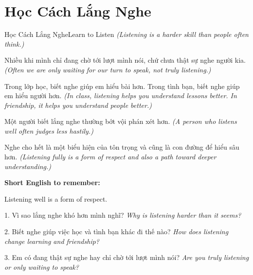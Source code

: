 \section{Học Cách Lắng Nghe}
\begin{truyen}{Học Cách Lắng Nghe}{Learn to Listen}
\textit{(Listening is a harder skill than people often think.)}

Nhiều khi mình chỉ đang chờ tới lượt mình nói, chứ chưa thật sự nghe người kia.
\textit{(Often we are only waiting for our turn to speak, not truly listening.)}

Trong lớp học, biết nghe giúp em hiểu bài hơn. Trong tình bạn, biết nghe giúp em hiểu người hơn.
\textit{(In class, listening helps you understand lessons better. In friendship, it helps you understand people better.)}

Một người biết lắng nghe thường bớt vội phán xét hơn.
\textit{(A person who listens well often judges less hastily.)}
\end{truyen}

\begin{baihoc}
Nghe cho hết là một biểu hiện của tôn trọng và cũng là con đường để hiểu sâu hơn.
\textit{(Listening fully is a form of respect and also a path toward deeper understanding.)}
\end{baihoc}

\begin{ghinhoanh}
\textbf{Short English to remember:}

Listening well is a form of respect.

\end{ghinhoanh}

\begin{tuhocnhanh}
1. Vì sao lắng nghe khó hơn mình nghĩ? \textit{Why is listening harder than it seems?}

2. Biết nghe giúp việc học và tình bạn khác đi thế nào? \textit{How does listening change learning and friendship?}

3. Em có đang thật sự nghe hay chỉ chờ tới lượt mình nói? \textit{Are you truly listening or only waiting to speak?}
\end{tuhocnhanh}
\ngancach

